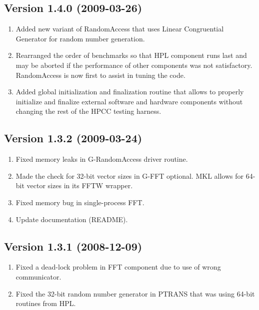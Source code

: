 \documentclass[twocolumn]{article}
\begin{document}
\subsection{Version 1.4.0 (2009-03-26)}
\begin{enumerate}
\item Added new variant of RandomAccess that uses Linear Congruential Generator for random number generation.
\item Rearranged the order of benchmarks so that HPL component runs last and may be aborted
if the performance of other components was not satisfactory. RandomAccess is now first to assist in tuning
the code.
\item Added global initialization and finalization routine that allows to properly initialize
and finalize external software and hardware components without changing the rest of the HPCC testing harness.
\end{enumerate}

\subsection{Version 1.3.2 (2009-03-24)}
\begin{enumerate}
\item Fixed memory leaks in G-RandomAccess driver routine.
\item Made the check for 32-bit vector sizes in G-FFT optional. MKL allows for 64-bit vector sizes in its FFTW wrapper.
\item Fixed memory bug in single-process FFT.
\item Update documentation (README).
\end{enumerate}

\subsection{Version 1.3.1 (2008-12-09)}
\begin{enumerate}
\item Fixed a dead-lock problem in FFT component due to use of wrong communicator.
\item Fixed the 32-bit random number generator in PTRANS that was using 64-bit
routines from HPL.
\end{enumerate}
\end{document}
